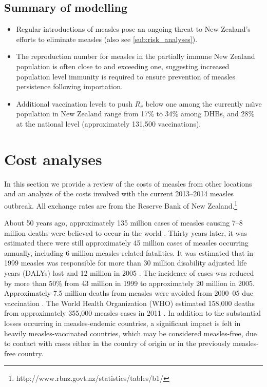 \documentclass{article}
\begin{document}
\subsection{Summary of modelling}
\begin{itemize}
\item Regular introductions of measles pose an ongoing threat to New Zealand's efforts to eliminate measles (also see \autoref{sub:risk_analyses}).
\item The reproduction number for measles in the partially immune New Zealand population is often close to and exceeding one, suggesting increased population level immunity is required to ensure prevention of measles persistence following importation.
 \item Additional vaccination levels to push $R_v$ below one among the currently na\"{\i}ve population in New Zealand range from 17\% to 34\% among DHBs, and 28\% at the national level (approximately 131,500 vaccinations).
\end{itemize}

\section{Cost analyses}
\label{sec:cb}

In this section we provide a review of the costs of measles from other locations and an analysis of the costs involved with the current 2013--2014 measles outbreak. All exchange rates are from the Reserve Bank of New Zealand.\footnote{http://www.rbnz.govt.nz/statistics/tables/b1/}

About 50 years ago, approximately 135 million cases of measles causing 7--8 million deaths were believed to occur in the world \citep{clements4}. Thirty years later, it was estimated there were still approximately 45 million cases of measles occurring annually, including 6 million measles-related fatalities. It was estimated that in 1999 measles was responsible for more than 30 million disability adjusted life years (DALYs) lost and 12 million in 2005 \citep{wolfson7}. The incidence of cases was reduced by more than 50\% from 43 million in 1999 to approximately 20 million in 2005. Approximately 7.5 million deaths from measles were avoided from 2000--05 due vaccination \citep{wolfson7}. The World Health Organization (WHO) estimated 158,000 deaths from approximately 355,000 measles cases in 2011 \citep{who13}.  In addition to the substantial losses occurring in measles-endemic countries, a significant impact is felt in heavily measles-vaccinated countries, which may be considered measles-free, due to contact with cases either in the country of origin or in the previously measles-free country.
\end{document}
